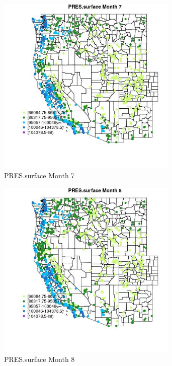 \begin{figure} 
\centering  
\includegraphics[width=0.77\textwidth]{Code_Outputs/Report_ML_input_PM25_Step4_part_f_de_duplicated_aveswNAs_MapObsMo7PRESsurface.jpg} 
\caption{\label{fig:Report_ML_input_PM25_Step4_part_f_de_duplicated_aveswNAsMapObsMo7PRESsurface}PRES.surface Month 7} 
\end{figure} 
 

\begin{figure} 
\centering  
\includegraphics[width=0.77\textwidth]{Code_Outputs/Report_ML_input_PM25_Step4_part_f_de_duplicated_aveswNAs_MapObsMo8PRESsurface.jpg} 
\caption{\label{fig:Report_ML_input_PM25_Step4_part_f_de_duplicated_aveswNAsMapObsMo8PRESsurface}PRES.surface Month 8} 
\end{figure} 
 

